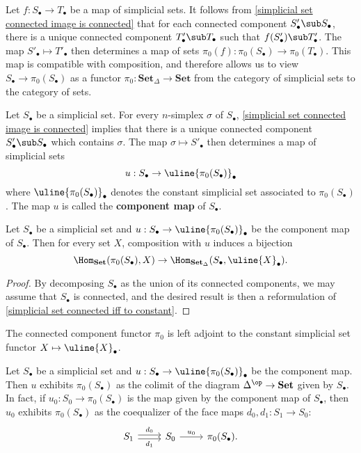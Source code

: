 \begin{remark}
Let $f:S_\bullet\to T_\bullet$ be a map of simplicial sets. It follows from \cref{simplicial set connected image is connected} that for each connected component $S'_\bullet\sub S_\bullet$, there is a unique connected component $T'_\bullet\sub T_\bullet$ such that $f(S'_\bullet)\sub T'_\bullet$. The map $S'_\bullet\mapsto T'_\bullet$ then determines a map of sets $\pi_0(f):\pi_0(S_\bullet)\to\pi_0(T_\bullet)$. This map is compatible
with composition, and therefore allows us to view $S_\bullet\to \pi_0(S_\bullet)$ as a functor $\pi_0:\mathbf{Set}_\Delta\to\mathbf{Set}$ from the category of simplicial sets to the category of sets.
\end{remark}
Let $S_\bullet$ be a simplicial set. For every $n$-simplex $\sigma$ of $S_\bullet$, \cref{simplicial set connected image is connected} implies that there is a unique connected component $S'_\bullet\sub S_\bullet$ which contains $\sigma$. The map $\sigma\mapsto S'_\bullet$ then determines a map of simplicial sets
\[u:S_\bullet\to\uline{\pi_0(S_\bullet)}_\bullet\]
where $\uline{\pi_0(S_\bullet)}_\bullet$ denotes the constant simplicial set associated to $\pi_0(S_\bullet)$. The map $u$ is called the \textbf{component map} of $S_\bullet$.
\begin{proposition}\label{simplicial set component map prop}
Let $S_\bullet$ be a simplicial set and $u:S_\bullet\to\uline{\pi_0(S_\bullet)}_\bullet$ be the component map of $S_\bullet$. Then for every set $X$, composition with $u$ induces a bijection
\[\Hom_{\mathbf{Set}}(\pi_0(S_\bullet),X)\to\Hom_{\mathbf{Set}_\Delta}(S_\bullet,\uline{X}_\bullet).\]
\end{proposition}
\begin{proof}
By decomposing $S_\bullet$ as the union of its connected components, we may assume that $S_\bullet$ is connected, and the desired result is then a reformulation of \cref{simplicial set connected iff to constant}.
\end{proof}
\begin{corollary}\label{simplicial set pi_0 is left adjoint to constant}
The connected component functor $\pi_0$ is left adjoint to the constant simplicial set functor $X\mapsto\uline{X}_\bullet$.
\end{corollary}
\begin{proposition}\label{simplicial set pi_0 is coequalizer of d_0,d_1}
Let $S_\bullet$ be a simplicial set and $u:S_\bullet\to\uline{\pi_0(S_\bullet)}_\bullet$ be the component map. Then $u$ exhibits $\pi_0(S_\bullet)$ as the colimit of the diagram $\Delta^{\op}\to\mathbf{Set}$ given by $S_\bullet$. In fact, if $u_0:S_0\to \pi_0(S_\bullet)$ is the map given by the component map of $S_\bullet$, then $u_0$ exhibits $\pi_0(S_\bullet)$ as the coequalizer of the face maps $d_0,d_1:S_1\to S_0$:
\[\begin{tikzcd}
S_1\ar[r,shift left=2pt,"d_0"]\ar[r,shift right=2pt,swap,"d_1"]&S_0\ar[r,"u_0"]&\pi_0(S_\bullet).
\end{tikzcd}\]
\end{proposition}
